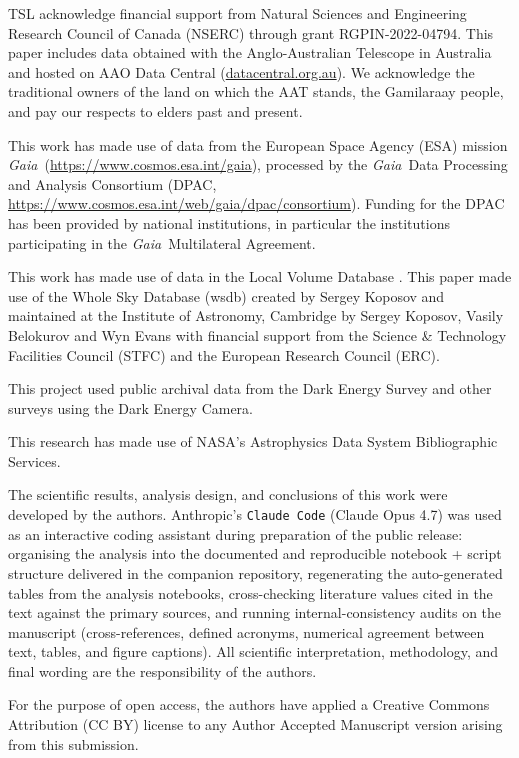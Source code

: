 \documentclass[twocolumn, apj, numberedappendix, appendixfloats]{openjournal_dhayaa}
\newcommand{\gaia}{\textit{Gaia}\xspace}
\begin{document}
\begin{acknowledgments}
TSL acknowledge financial support from Natural Sciences and Engineering Research Council of Canada (NSERC) through grant RGPIN-2022-04794.
This paper includes data obtained with the Anglo-Australian Telescope in Australia and hosted on AAO Data Central (\url{datacentral.org.au}). We acknowledge the traditional owners of the land on which the AAT stands, the Gamilaraay people, and pay our respects to elders past and present.

This work has made use of data from the European Space Agency (ESA) mission \gaia\ (\url{https://www.cosmos.esa.int/gaia}), processed by the \gaia\ Data Processing and Analysis Consortium (DPAC, \url{https://www.cosmos.esa.int/web/gaia/dpac/consortium}). Funding for the DPAC has been provided by national institutions, in particular the institutions participating in the \gaia\ Multilateral Agreement.

This work has made use of data in the Local Volume Database \citep{Pace2025}.
This paper made use of the Whole Sky Database (wsdb) created by Sergey Koposov and maintained at the Institute of Astronomy, Cambridge by Sergey Koposov, Vasily Belokurov and Wyn Evans with financial support from the Science \& Technology Facilities Council (STFC) and the European Research Council (ERC).

This project used public archival data from the Dark Energy Survey and other surveys using the Dark Energy Camera.

This research has made use of NASA's Astrophysics Data System Bibliographic Services.

The scientific results, analysis design, and conclusions of this work were developed by the authors.  Anthropic's \texttt{Claude Code} (Claude Opus 4.7) was used as an interactive coding assistant during preparation of the public release: organising the analysis into the documented and reproducible notebook + script structure delivered in the companion repository, regenerating the auto-generated tables from the analysis notebooks, cross-checking literature values cited in the text against the primary sources, and running internal-consistency audits on the manuscript (cross-references, defined acronyms, numerical agreement between text, tables, and figure captions).  All scientific interpretation, methodology, and final wording are the responsibility of the authors.

For the purpose of open access, the authors have applied a Creative Commons Attribution (CC BY) license to any Author Accepted Manuscript version arising from this submission.
\end{acknowledgments}
\end{document}
